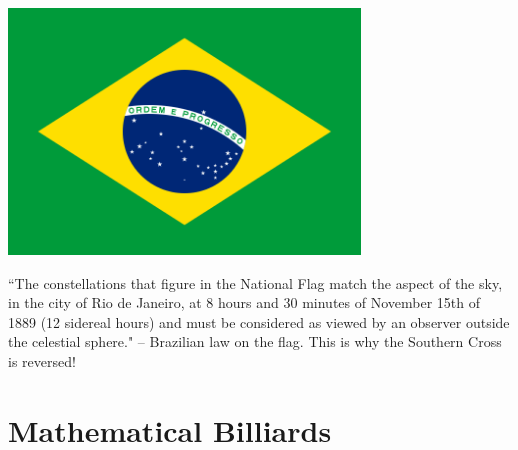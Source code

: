 \documentclass[compress,aspectratio=169,10pt,usenames,dvipsnames]{beamer}
\begin{document}

\begin{frame}

\vfill 

\begin{center}
\includegraphics[width=0.7\textwidth]{Flag_of_Brazil} 
\end{center}
{\tiny ``The constellations that figure in the National Flag match the aspect of the sky, in the city of Rio de Janeiro, at 8 hours and 30 minutes of November 15th of 1889 (12 sidereal hours) and must be considered as viewed by an observer outside the celestial sphere." -- Brazilian law on the flag. This is why the Southern Cross is reversed!}

\vfill

\end{frame}


\section{Mathematical Billiards}
\begin{frame}
  \sectionpage
\end{frame}
\end{document}
